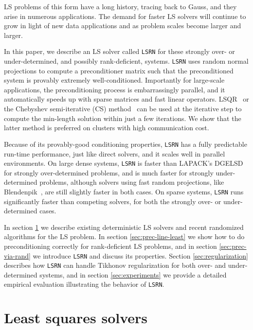 \documentclass{siamltex}
\begin{document}
LS problems of this form have a long history, tracing back to Gauss, and they
arise in numerous applications.  The demand for faster LS solvers will continue
to grow in light of new data applications and as problem scales become larger
and larger.

In this paper, we describe an LS solver called \texttt{LSRN} for these strongly
over- or under-determined, and possibly rank-deficient, systems. \texttt{LSRN}
uses random normal projections to compute a preconditioner matrix such that the
preconditioned system is provably extremely well-conditioned.  Importantly for
large-scale applications, the preconditioning process is embarrassingly
parallel, and it automatically speeds up with sparse matrices and fast linear
operators.  LSQR~\cite{paige1982lsqr} or the Chebyshev semi-iterative (CS)
method~\cite{golub1961chebyshev} can be used at the iterative step to compute
the min-length solution within just a few iterations.  We show that the latter
method is preferred on clusters with high communication cost.

Because of its provably-good conditioning properties, \texttt{LSRN} has a fully
predictable run-time performance, just like direct solvers, and it scales well
in parallel environments. On large dense systems, \texttt{LSRN} is faster than
LAPACK's DGELSD for strongly over-determined problems, and is much faster for
strongly under-determined problems, although solvers using fast random
projections, like Blendenpik~\cite{avron2010blendenpik}, are still slightly
faster in both cases.  On sparse systems, \texttt{LSRN} runs significantly
faster than competing solvers, for both the strongly over- or under-determined
cases.

In section \ref{sec:linear-least-squares} we describe existing deterministic LS
solvers and recent randomized algorithms for the LS problem.  In section
\ref{sec:prec-line-least} we show how to do preconditioning correctly for
rank-deficient LS problems, and in section \ref{sec:prec-via-rand} we introduce
\texttt{LSRN} and discuss its properties.  Section \ref{sec:regularization}
describes how \texttt{LSRN} can handle Tikhonov regularization for both over-
and under-determined systems, and in section \ref{sec:experiments} we provide a
detailed empirical evaluation illustrating the behavior of \texttt{LSRN}.


\section{Least squares solvers}
\label{sec:linear-least-squares}
\end{document}
